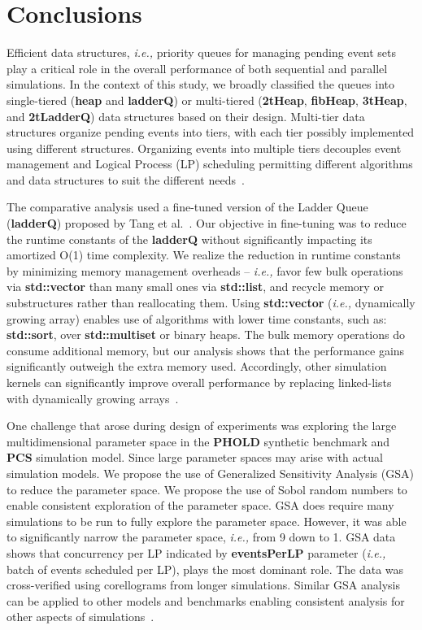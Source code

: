 \chapter{Conclusions}

Efficient data structures, \textit{i.e.,} priority queues for managing pending
event sets play a critical role in the overall performance of both
sequential and parallel simulations.  In the context of this study, we
broadly classified the queues into single-tiered (\textbf{heap} and
\textbf{ladderQ}) or multi-tiered (\textbf{2tHeap}, \textbf{fibHeap}, \textbf{3tHeap}, and
\textbf{2tLadderQ}) data structures based on their design.  Multi-tier data
structures organize pending events into tiers, with each tier possibly
implemented using different structures.  Organizing events into
multiple tiers decouples event management and Logical Process (LP)
scheduling permitting different algorithms and data structures to suit
the different needs~\cite{higiro2017multi}.

The comparative analysis used a fine-tuned version of the Ladder Queue
(\textbf{ladderQ}) proposed by Tang et al.~\cite{tang-05}.  Our objective in
fine-tuning was to reduce the runtime constants of the \textbf{ladderQ}
without significantly impacting its amortized O(1) time complexity. We realize the reduction in runtime constants by minimizing
memory management overheads -- \textit{i.e.,}  favor few bulk
operations via \textbf{std::vector} than many small ones via \textbf{std::list}, and  recycle memory or substructures rather than
reallocating them.  Using \textbf{std::vector} (\textit{i.e.,} dynamically growing
array) enables use of algorithms with lower time constants, such as:
\textbf{std::sort}, over \textbf{std::multiset} or binary heaps.  The bulk
memory operations do consume additional memory, but our analysis shows
that the performance gains significantly outweigh the extra memory
used.  Accordingly, other simulation kernels can significantly improve
overall performance by replacing linked-lists with dynamically growing
arrays~\cite{higiro2017multi}.

One challenge that arose during design of experiments was exploring
the large multidimensional parameter space in the \textbf{PHOLD} synthetic
benchmark and \textbf{PCS} simulation model.  Since large parameter spaces may arise with actual
simulation models.  We propose the use of Generalized Sensitivity
Analysis (GSA) to reduce the parameter space.  We propose the use of
Sobol random numbers to enable consistent exploration of the parameter
space.  GSA does require many simulations to be run to fully explore
the parameter space.  However, it was able to significantly narrow the
parameter space, \textit{i.e.,} from 9 down to 1.  GSA data shows that
concurrency per LP indicated by \textbf{eventsPerLP} parameter (\textit{i.e.,} batch
of events scheduled per LP), plays the most dominant role.  The data
was cross-verified using corellograms from longer simulations.  Similar
GSA analysis can be applied to other models and benchmarks enabling
consistent analysis for other aspects of simulations~\cite{higiro2017multi}.

